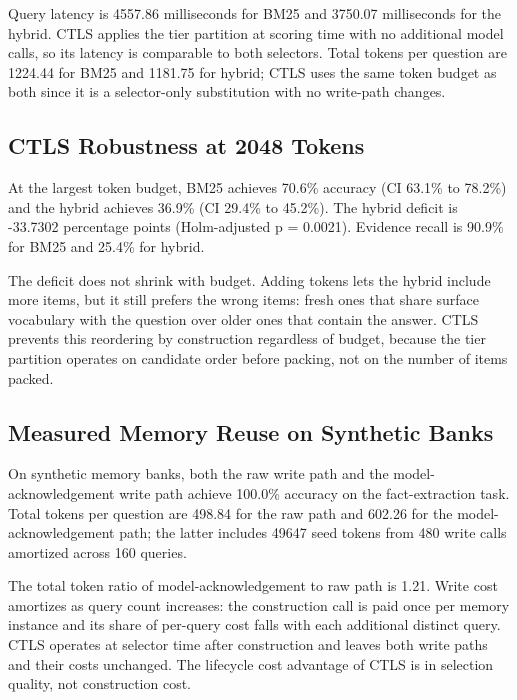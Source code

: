 Query latency is 4557.86 milliseconds for BM25 and 3750.07 milliseconds for the hybrid. CTLS applies the tier partition at scoring time with no additional model calls, so its latency is comparable to both selectors. Total tokens per question are 1224.44 for BM25 and 1181.75 for hybrid; CTLS uses the same token budget as both since it is a selector-only substitution with no write-path changes.

\subsection{CTLS Robustness at 2048 Tokens}

\label{sec:result_protocol_replication}

At the largest token budget, BM25 achieves 70.6\% accuracy (CI 63.1\% to 78.2\%) and the hybrid achieves 36.9\% (CI 29.4\% to 45.2\%). The hybrid deficit is -33.7302 percentage points (Holm-adjusted p = 0.0021). Evidence recall is 90.9\% for BM25 and 25.4\% for hybrid.

The deficit does not shrink with budget. Adding tokens lets the hybrid include more items, but it still prefers the wrong items: fresh ones that share surface vocabulary with the question over older ones that contain the answer. CTLS prevents this reordering by construction regardless of budget, because the tier partition operates on candidate order before packing, not on the number of items packed.

\subsection{Measured Memory Reuse on Synthetic Banks}

\label{sec:result_memory_reuse}

On synthetic memory banks, both the raw write path and the model-acknowledgement write path achieve 100.0\% accuracy on the fact-extraction task. Total tokens per question are 498.84 for the raw path and 602.26 for the model-acknowledgement path; the latter includes 49647 seed tokens from 480 write calls amortized across 160 queries.

The total token ratio of model-acknowledgement to raw path is 1.21. Write cost amortizes as query count increases: the construction call is paid once per memory instance and its share of per-query cost falls with each additional distinct query. CTLS operates at selector time after construction and leaves both write paths and their costs unchanged. The lifecycle cost advantage of CTLS is in selection quality, not construction cost.

